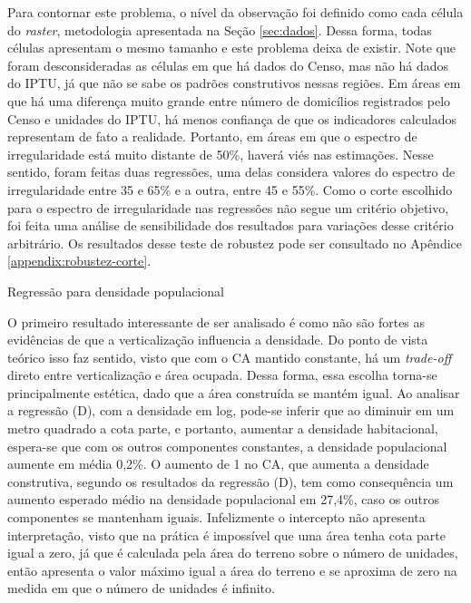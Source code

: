 Para contornar este problema, o nível da observação foi definido como cada célula do \textit{raster}, metodologia apresentada na Seção \ref{sec:dados}. Dessa forma, todas células apresentam o mesmo tamanho e este problema deixa de existir. Note que foram desconsideradas as células em que há dados do Censo, mas não há dados do IPTU, já que não se sabe os padrões construtivos nessas regiões. Em áreas em que há uma diferença muito grande entre número de domicílios registrados pelo Censo e unidades do IPTU, há menos confiança de que os indicadores calculados representam de fato a realidade. Portanto, em áreas em que o espectro de irregularidade está muito distante de 50\%, haverá viés nas estimações. Nesse sentido, foram feitas duas regressões, uma delas considera valores do espectro de irregularidade entre 35 e 65\% e a outra, entre 45 e 55\%. Como o corte escolhido para o espectro de irregularidade nas regressões não segue um critério objetivo, foi feita uma análise de sensibilidade dos resultados para variações desse critério arbitrário. Os resultados desse teste de robustez pode ser consultado no Apêndice \ref{appendix:robustez-corte}.

\begin{table}[h]
    \caption{Regressão para densidade populacional}
    
    \label{tab:reg}
    \addtocounter{table}{-1}
\end{table}

O primeiro resultado interessante de ser analisado é como não são fortes as evidências de que a verticalização influencia a densidade. Do ponto de vista teórico isso faz sentido, visto que com o CA mantido constante, há um \textit{trade-off} direto entre verticalização e área ocupada. Dessa forma, essa escolha torna-se principalmente estética, dado que a área construída se mantém igual. Ao analisar a regressão (D), com a densidade em log, pode-se inferir que ao diminuir em um metro quadrado a cota parte, e portanto, aumentar a densidade habitacional, espera-se que com os outros componentes constantes, a densidade populacional aumente em média 0,2\%. O aumento de 1 no CA, que aumenta a densidade construtiva, segundo os resultados da regressão (D), tem como consequência um aumento esperado médio na densidade populacional em 27,4\%, caso os outros componentes se mantenham iguais. Infelizmente o intercepto não apresenta interpretação, visto que na prática é impossível que uma área tenha cota parte igual a zero, já que é calculada pela área do terreno sobre o número de unidades, então apresenta o valor máximo igual a área do terreno e se aproxima de zero na medida em que o número de unidades é infinito. 

